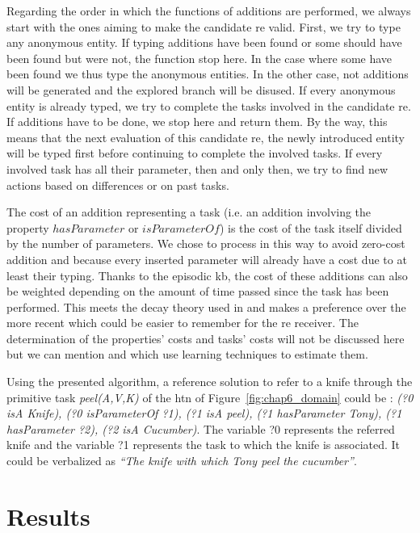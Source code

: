 Regarding the order in which the functions of additions are performed, we always start with the ones aiming to make the candidate \acrshort{re} valid. First, we try to type any anonymous entity. If typing additions have been found or some should have been found but were not, the function stop here. In the case where some have been found we thus type the anonymous entities. In the other case, not additions will be generated and the explored branch will be disused. If every anonymous entity is already typed, we try to complete the tasks involved in the candidate \acrshort{re}. If additions have to be done, we stop here and return them. By the way, this means that the next evaluation of this candidate \acrshort{re}, the newly introduced entity will be typed first before continuing to complete the involved tasks. If every involved task has all their parameter, then and only then, we try to find new actions based on differences or on past tasks.

The cost of an addition representing a task (i.e. an addition involving the property $hasParameter$ or $isParameterOf$) is the cost of the task itself divided by the number of parameters. We chose to process in this way to avoid zero-cost addition and because every inserted parameter will already have a cost due to at least their typing. Thanks to the episodic \acrshort{kb}, the cost of these additions can also be weighted depending on the amount of time passed since the task has been performed. This meets the decay theory used in \cite{williams_2020_toward} and makes a preference over the more recent which could be easier to remember for the \acrshort{re} receiver. The determination of the properties' costs and tasks' costs will not be discussed here but we can mention \cite{belke_2002_tracking} and \cite{koolen_2012_learning} which use learning techniques to estimate them.

Using the presented algorithm, a reference solution to refer to a knife through the primitive task \textit{peel(A,V,K)} of the \acrshort{htn} of Figure~\ref{fig:chap6_domain} could be : \textit{(?0 isA Knife), (?0 isParameterOf ?1), (?1 isA peel), (?1 hasParameter Tony), (?1 hasParameter ?2), (?2 isA Cucumber)}. The variable ?0 represents the referred knife and the variable ?1 represents the task to which the knife is associated. It could be verbalized as \textit{``The knife with which Tony peel the cucumber''}.

\section{Results}


